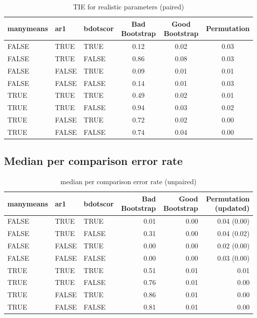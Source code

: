 \documentclass{article}
\begin{document}
\begin{table}[H]
\centering
\begin{tabular}{lllccc}
  \hline
  manymeans & ar1 & bdotscor &  Bad Bootstrap & Good Bootstrap & Permutation \\ 
  \hline
FALSE & TRUE & TRUE & 0.12 & 0.02 & 0.03 \\ 
  FALSE & TRUE & FALSE & 0.86 & 0.08 & 0.03 \\ 
  FALSE & FALSE & TRUE & 0.09 & 0.01 & 0.01 \\ 
  FALSE & FALSE & FALSE & 0.14 & 0.01 & 0.03 \\ 
  TRUE & TRUE & TRUE & 0.49 & 0.02 & 0.01 \\ 
  TRUE & TRUE & FALSE & 0.94 & 0.03 & 0.02 \\ 
  TRUE & FALSE & TRUE & 0.72 & 0.02 & 0.00 \\ 
  TRUE & FALSE & FALSE & 0.74 & 0.04 & 0.00 \\ 
   \hline
\end{tabular}
\caption{TIE for realistic parameters (paired)}
\end{table}

\subsection{Median per comparison error rate}

\begin{table}[H]
\centering
\begin{tabular}{lllrrr}
  \hline
  manymeans & ar1 & bdotscor &  Bad Bootstrap & Good Bootstrap & Permutation (updated) \\ 
  \hline
FALSE & TRUE & TRUE & 0.01 & 0.00 & 0.04  (0.00)\\ 
  FALSE & TRUE & FALSE & 0.31 & 0.00 & 0.04  (0.02)\\ 
  FALSE & FALSE & TRUE & 0.00 & 0.00 & 0.02  (0.00)\\ 
  FALSE & FALSE & FALSE & 0.00 & 0.00 & 0.03 (0.00)\\ 
  TRUE & TRUE & TRUE & 0.51 & 0.01 & 0.01 \\ 
  TRUE & TRUE & FALSE & 0.76 & 0.01 & 0.00 \\ 
  TRUE & FALSE & TRUE & 0.86 & 0.01 & 0.00 \\ 
  TRUE & FALSE & FALSE & 0.81 & 0.01 & 0.00 \\ 
   \hline
\end{tabular}
\caption{median per comparison error rate (unpaired)}
\end{table}
\end{document}

